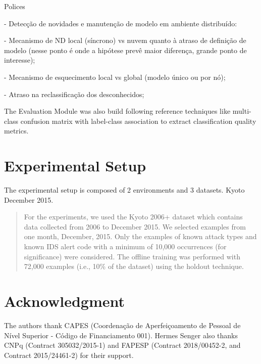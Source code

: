 \documentclass[conference]{IEEEtran}
\begin{document}

Polices

- Detecção de novidades e manutenção de modelo em ambiente distribuído:

  - Mecanismo de ND local (síncrono) vs nuvem quanto à atraso de definição de modelo
    (nesse ponto é onde a hipótese prevê maior diferença, grande ponto de interesse);

  - Mecanismo de esquecimento local vs global (modelo único ou por nó);

  - Atraso na reclassificação dos desconhecidos;


The Evaluation Module was also build following reference techniques like
multi-class confusion matrix with label-class association
\cite{Faria2016minas}
to extract classification quality metrics.

\section{Experimental Setup}

The experimental setup is composed of 2 environments and 3 datasets.
Kyoto December 2015.

\begin{quote}
  For the experiments, we used the Kyoto 2006+ dataset
  which contains data collected from 2006 to December 2015.
  We selected examples from one month, December, 2015. Only the examples of known
  attack types and known IDS alert code with a minimum of 10,000 occurrences (for
  significance) were considered. The offline training was performed with 72,000
  examples (i.e., 10\% of the dataset) using the holdout technique.
  \cite{Cassales2019a}
\end{quote}




\section*{Acknowledgment}

The authors thank CAPES (Coordenação de Aperfeiçoamento de Pessoal de Nível Superior - Código de Financiamento 001).
Hermes Senger also thanks CNPq (Contract 305032/2015-1) and FAPESP (Contract 2018/00452-2, and Contract 2015/24461-2) for their support.

% 


\end{document}
